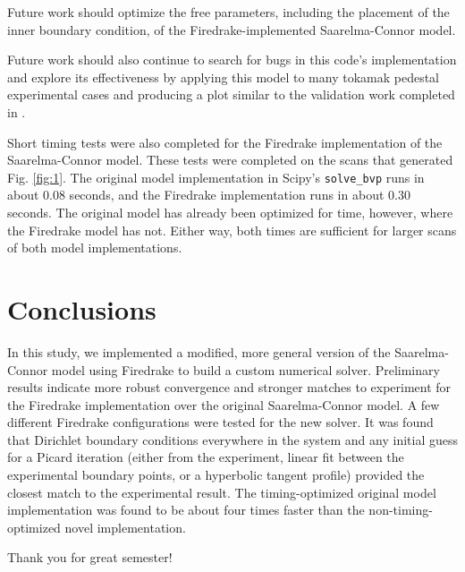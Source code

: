 \documentclass[twocolumn,secnumarabic,amssymb, nobibnotes, aps, prd]{revtex4-2}
\begin{document}
Future work should optimize the free parameters, including the placement of the inner boundary condition, of the Firedrake-implemented Saarelma-Connor model.

Future work should also continue to search for bugs in this code's implementation and explore its effectiveness by applying this model to many tokamak pedestal experimental cases and producing a plot similar to the validation work completed in \cite{saarelma2023testing}.

Short timing tests were also completed for the Firedrake implementation of the Saarelma-Connor model. 
These tests were completed on the scans that generated Fig. \ref{fig:1}.
The original model implementation in Scipy's \texttt{solve\_bvp} runs in about 0.08 seconds, and the Firedrake implementation runs in about 0.30 seconds.
The original model has already been optimized for time, however, where the Firedrake model has not. 
Either way, both times are sufficient for larger scans of both model implementations.


\section{Conclusions}
In this study, we implemented a modified, more general version of the Saarelma-Connor model \cite{saarelma2023testing} using Firedrake to build a custom numerical solver.
Preliminary results indicate more robust convergence and stronger matches to experiment for the Firedrake implementation over the original Saarelma-Connor model.
A few different Firedrake configurations were tested for the new solver.
It was found that Dirichlet boundary conditions everywhere in the system and any initial guess for a Picard iteration (either from the experiment, linear fit between the experimental boundary points, or a hyperbolic tangent profile) provided the closest match to the experimental result.
The timing-optimized original model implementation was found to be about four times faster than the non-timing-optimized novel implementation.



\begin{acknowledgments}
Thank you for great semester!
\end{acknowledgments}




\appendix
\end{document}
